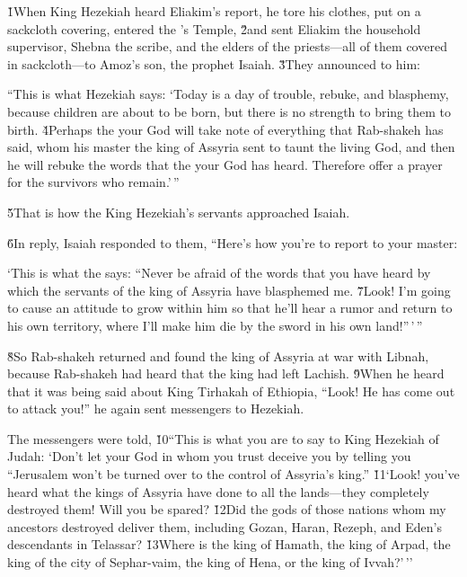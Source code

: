 \v{1}When King Hezekiah heard Eliakim's report, he tore his clothes, put on a sackcloth covering, entered the 's Temple, \v{2}and sent Eliakim the household supervisor, Shebna the scribe, and the elders of the priests---all of them covered in sackcloth---to Amoz's son, the prophet Isaiah. \v{3}They announced to him:

\begin{poetry}
\poeml ``This is what Hezekiah says: `Today is a day of trouble, rebuke, and blasphemy, because children are about to be born, but there is no strength to bring them to birth. \v{4}Perhaps the  your God will take note of everything that Rab-shakeh has said, whom his master the king of Assyria sent to taunt the living God, and then he will rebuke the words that the  your God has heard. Therefore offer a prayer for the survivors who remain.'\,''
\end{poetry}

\v{5}That is how the King Hezekiah's servants approached Isaiah.

\v{6}In reply, Isaiah responded to them, ``Here's how you're to report to your master:

\begin{poetry}
\poeml `This is what the  says: ``Never be afraid of the words that you have heard by which the servants of the king of Assyria have blasphemed me. \v{7}Look! I'm going to cause an attitude to grow within him so that he'll hear a rumor and return to his own territory, where I'll make him die by the sword in his own land!''\,'\,''
\end{poetry}

\v{8}So Rab-shakeh returned and found the king of Assyria at war with Libnah, because Rab-shakeh had heard that the king had left Lachish. \v{9}When he heard that it was being said about King Tirhakah of Ethiopia, ``Look! He has come out to attack you!'' he again sent messengers to Hezekiah.

The messengers were told, \v{10}``This is what you are to say to King Hezekiah of Judah: `Don't let your God in whom you trust deceive you by telling you ``Jerusalem won't be turned over to the control of Assyria's king.'' \v{11}`Look! you've heard what the kings of Assyria have done to all the lands---they completely destroyed them! Will you be spared? \v{12}Did the gods of those nations whom my ancestors destroyed deliver them, including Gozan, Haran, Rezeph, and Eden's descendants in Telassar? \v{13}Where is the king of Hamath, the king of Arpad, the king of the city of Sephar-vaim, the king of Hena, or the king of Ivvah?'\,''

